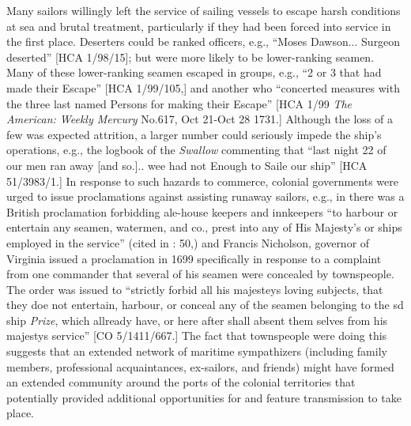 Many sailors willingly left the service of sailing vessels to escape harsh conditions at sea and brutal treatment, particularly if they had been forced into service in the first place. Deserters could be ranked officers, e.g., “Moses Dawson... Surgeon deserted” [HCA 1/98/15]; but were more likely to be lower-ranking seamen. Many of these lower-ranking seamen escaped in groups, e.g., “2 or 3 that had made their Escape” [HCA 1/99/105,] and another  who “concerted measures with the three last named Persons for making their Escape” [HCA 1/99 \textit{The American: Weekly Mercury} No.617, Oct 21-Oct 28 1731.] Although the loss of a few  was expected attrition, a larger number could seriously impede the ship’s operations, e.g., the logbook of the \textit{Swallow} commenting that “last night 22 of our men ran away [and so.]..  wee had not Enough to Saile our ship” [HCA 51/3983/1.] In response to such hazards to commerce, colonial governments were urged to issue proclamations against  assisting runaway sailors, e.g., in \citealt{April1643} there was a British proclamation forbidding ale-house keepers and innkeepers “to harbour or entertain any seamen, watermen, and co., prest into any of His Majesty’s or  ships employed in the service” (cited in \citealt{Lavery2009}: 50,) and Francis Nicholson, governor of Virginia issued a proclamation in 1699 specifically in response to a complaint from one commander that several of his seamen were concealed by townspeople. The order was issued to “strictly forbid all his majesteys loving subjects, that they doe not entertain, harbour, or conceal any of the seamen belonging to the sd ship \textit{ Prize}, which allready have, or here after shall absent them selves from his majestys service” [CO 5/1411/667.] The fact that townspeople were doing this suggests that an extended network of maritime sympathizers (including family members, professional acquaintances, ex-sailors, and friends) might have formed an extended community around the ports of the colonial territories that potentially provided additional opportunities for  and feature transmission to take place. 

